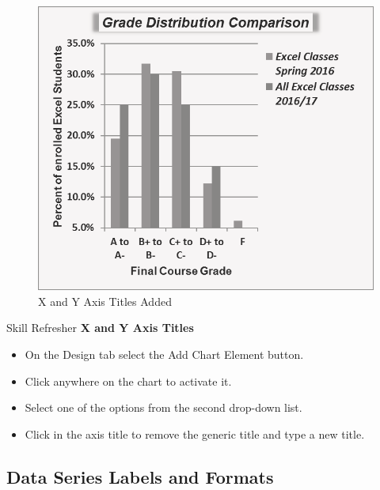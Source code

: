 \begin{figure}[H]
	\centering
	\includegraphics[width=\maxwidth{.95\linewidth}]{gfx/ch04_fig35}
	\caption{X and Y Axis Titles Added}
	\label{04:fig35}
\end{figure}

\begin{center}
	\begin{sklbox}{Skill Refresher}
		\textbf{X and Y Axis Titles}
		\\
		\begin{itemize}
			\setlength{\itemsep}{0pt}
			\setlength{\parskip}{0pt}
			\setlength{\parsep}{0pt}

			\item On the Design tab select the Add Chart Element button.
			\item Click anywhere on the chart to activate it.
			\item Select one of the options from the second drop-down list.
			\item Click in the axis title to remove the generic title and type a new title.
			
		\end{itemize}
	\end{sklbox}
\end{center}

\subsection{Data Series Labels and Formats}

